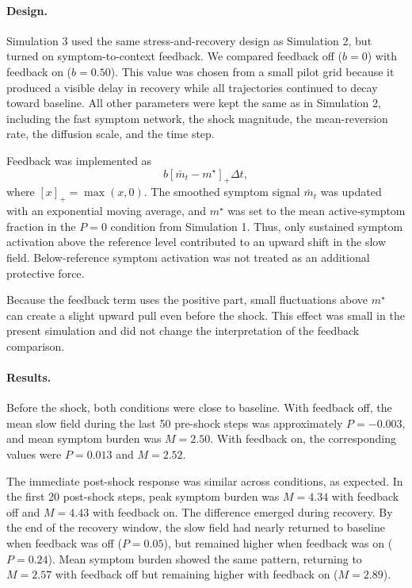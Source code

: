 \paragraph{Design.}
Simulation 3 used the same stress-and-recovery design as Simulation 2, but
turned on symptom-to-context feedback. We compared feedback off (\(b=0\)) with
feedback on (\(b=0.50\)). This value was chosen from a small pilot grid because
it produced a visible delay in recovery while all trajectories continued to
decay toward baseline. All other parameters were kept the same as in Simulation
2, including the fast symptom network, the shock magnitude, the mean-reversion
rate, the diffusion scale, and the time step.

Feedback was implemented as
\[
b[\bar m_t-m^\star]_+\Delta t,
\]
where \([x]_+=\max(x,0)\). The smoothed symptom signal \(\bar m_t\) was updated
with an exponential moving average, and \(m^\star\) was set to the mean
active-symptom fraction in the \(P=0\) condition from Simulation 1. Thus, only
sustained symptom activation above the reference level contributed to an upward
shift in the slow field. Below-reference symptom activation was not treated as
an additional protective force.

Because the feedback term uses the positive part, small fluctuations above
\(m^\star\) can create a slight upward pull even before the shock. This effect
was small in the present simulation and did not change the interpretation of
the feedback comparison.

\paragraph{Results.}
Before the shock, both conditions were close to baseline. With feedback off,
the mean slow field during the last 50 pre-shock steps was approximately
\(P=-0.003\), and mean symptom burden was \(M=2.50\). With feedback on, the
corresponding values were \(P=0.013\) and \(M=2.52\).

The immediate post-shock response was similar across conditions, as expected.
In the first 20 post-shock steps, peak symptom burden was \(M=4.34\) with
feedback off and \(M=4.43\) with feedback on. The difference emerged during
recovery. By the end of the recovery window, the slow field had nearly returned
to baseline when feedback was off (\(P=0.05\)), but remained higher when
feedback was on (\(P=0.24\)). Mean symptom burden showed the same pattern,
returning to \(M=2.57\) with feedback off but remaining higher with feedback on
(\(M=2.89\)).

